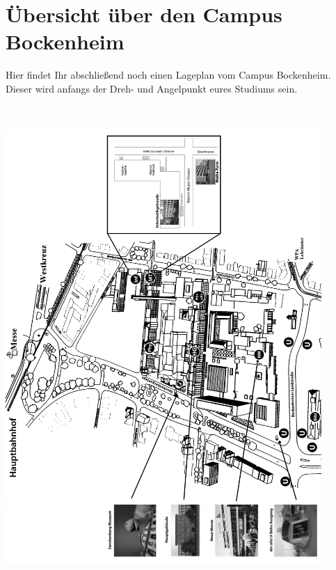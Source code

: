 \documentclass[a4paper,12pt]{scrartcl}
\begin{document}



\section{Übersicht über den Campus Bockenheim}


Hier findet Ihr abschließend noch einen Lageplan vom Campus Bockenheim. Dieser wird anfangs der Dreh- und Angelpunkt eures Studiums sein.


~
\thispagestyle{empty}
\begin{center}
\includegraphics[width=0.9\textwidth]{bitmaps/uni-plan_01_ohne_afe}
\includegraphics[width=0.9\textwidth]{bitmaps/uni-plan_02_ohne_afe}
\end{center}
\newpage
\end{document}
